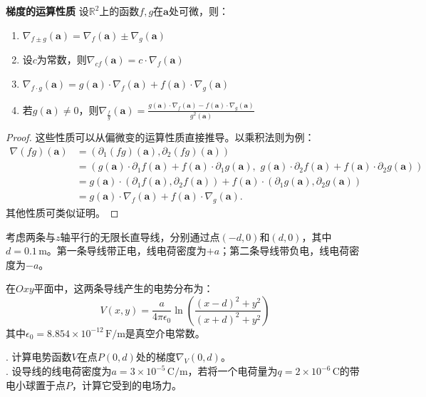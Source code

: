 \documentclass[12pt,UTF8,fontset=none]{ctexbook}
\begin{document}
\begin{tm}{\textbf{梯度的运算性质}}
设$\mathbb{R}^2$上的函数$f, g$在$\mathbf{a}$处可微，则：
\begin{enumerate}[label=\arabic*.]
\item $\nabla_{f \pm g}(\mathbf{a}) = \nabla_f(\mathbf{a}) \pm \nabla_g(\mathbf{a})$
\item 设$c$为常数，则$\nabla_{cf}(\mathbf{a}) = c\cdot \nabla_f(\mathbf{a})$
\item $\nabla_{f\cdot g}(\mathbf{a}) = g(\mathbf{a})\cdot \nabla_f(\mathbf{a}) + f(\mathbf{a})\cdot \nabla_g(\mathbf{a})$
\item 若$g(\mathbf{a}) \neq 0$，则$\displaystyle\nabla_{\frac{f}{g}}(\mathbf{a}) = \frac{g(\mathbf{a})\cdot \nabla_f(\mathbf{a}) - f(\mathbf{a})\cdot \nabla_g(\mathbf{a})}{g^2(\mathbf{a})}$
\end{enumerate}
\end{tm}
\begin{proof}
这些性质可以从偏微变的运算性质直接推导。以乘积法则为例：
\begin{align*}
\nabla(fg)(\mathbf{a}) &= (\partial_1(fg)(\mathbf{a}), \partial_2(fg)(\mathbf{a})) \\
&= (g(\mathbf{a})\cdot \partial_1 f(\mathbf{a}) + f(\mathbf{a})\cdot \partial_1 g(\mathbf{a}),\,\, g(\mathbf{a})\cdot \partial_2 f(\mathbf{a}) + f(\mathbf{a})\cdot \partial_2 g(\mathbf{a})) \\
&= g(\mathbf{a})\cdot (\partial_1 f(\mathbf{a}), \partial_2 f(\mathbf{a})) + f(\mathbf{a})\cdot (\partial_1 g(\mathbf{a}), \partial_2 g(\mathbf{a})) \\
&= g(\mathbf{a})\cdot \nabla_f(\mathbf{a}) + f(\mathbf{a})\cdot \nabla_g(\mathbf{a}).
\end{align*}
其他性质可类似证明。
\end{proof}

\begin{et}
考虑两条与$z$轴平行的无限长直导线，分别通过点$(-d,0)$和$(d,0)$，其中$d=0.1\,\mathrm{m}$。第一条导线带正电，线电荷密度为$+a$；第二条导线带负电，线电荷密度为$-a$。

在$Oxy$平面中，这两条导线产生的电势分布为：
$$ V(x,y) = \frac{a}{4\pi\epsilon_0} \ln\left(\frac{(x-d)^2+y^2}{(x+d)^2+y^2}\right) $$
其中$\epsilon_0 = 8.854\times10^{-12}\,\mathrm{F/m}$是真空介电常数。

. 计算电势函数$V$在点$P(0,d)$处的梯度$\nabla_V(0,d)$。\\
. 设导线的线电荷密度为$a=3\times10^{-5}\,\mathrm{C/m}$，若将一个电荷量为$q=2\times10^{-6}\,\mathrm{C}$的带电小球置于点$P$，计算它受到的电场力。
\end{et}
\end{document}
